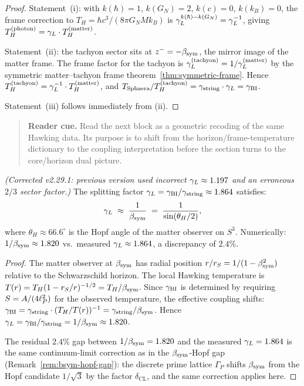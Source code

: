 \begin{proof}
Statement~(i): with $k(\hbar)=1$, $k(G_N)=2$, $k(c)=0$, $k(k_B)=0$,
the frame correction to $T_H = \hbar c^3/(8\pi G_N M k_B)$ is
$\gamma_L^{k(\hbar)-k(G_N)} = \gamma_L^{-1}$, giving
$T_H^{(\mathrm{photon})} = \gamma_L\cdot T_H^{(\mathrm{matter})}$.

Statement~(ii): the tachyon sector sits at $z^- = -\beta_{\mathrm{sym}}$, the mirror
image of the matter frame. The frame factor for the tachyon is
$\gamma_L^{(\mathrm{tachyon})} = 1/\gamma_L^{(\mathrm{matter})}$ by the symmetric
matter--tachyon frame theorem~\ref{thm:symmetric-frame}. Hence
$T_H^{(\mathrm{tachyon})} = \gamma_L^{-1}\cdot T_H^{(\mathrm{matter})}$, and
$T_{\mathrm{Sphaera}}/T_H^{(\mathrm{tachyon})}
= \gamma_{\mathrm{string}}\cdot\gamma_L = \gamma_{\mathrm{BI}}$.

Statement~(iii) follows immediately from (ii).
\end{proof}

\begin{quote}\small
\noindent\textbf{Reader cue.} Read the next block as a geometric recoding of the same Hawking data. Its purpose is to shift from the horizon/frame-temperature dictionary to the coupling interpretation before the section turns to the core/horizon dual picture.
\end{quote}

\begin{theorem}
\label{thm:dual-origin}
\emph{(Corrected v2.29.1: previous version used incorrect $\gamma_L\approx 1.197$
and an erroneous $2/3$ sector factor.)}
The splitting factor $\gamma_L=\gamma_{\mathrm{BI}}/\gamma_{\mathrm{string}}\approx 1.864$ satisfies:
\[
  \gamma_L \;\approx\; \frac{1}{\beta_{\mathrm{sym}}} \;=\; \frac{1}{\sin(\theta_H/2)},
\]
where $\theta_H\approx 66.6^\circ$ is the Hopf angle of the matter observer
on $S^3$. Numerically: $1/\beta_{\mathrm{sym}} \approx 1.820$ vs.\ measured
$\gamma_L\approx 1.864$, a discrepancy of $2.4\%$.
\end{theorem}

\begin{proof}
The matter observer at $\beta_{\mathrm{sym}}$ has radial position $r/r_S=1/(1-\beta_{\mathrm{sym}}^2)$
relative to the Schwarzschild horizon.
The local Hawking temperature is $T(r)=T_H(1-r_S/r)^{-1/2}=T_H/\beta_{\mathrm{sym}}$.
Since $\gamma_{\mathrm{BI}}$ is determined by requiring $S=A/(4\ell_P^2)$ for the observed
temperature, the effective coupling shifts:
$\gamma_{\mathrm{BI}} = \gamma_{\mathrm{string}}\cdot(T_H/T(r))^{-1} = \gamma_{\mathrm{string}}/\beta_{\mathrm{sym}}$.
Hence $\gamma_L = \gamma_{\mathrm{BI}}/\gamma_{\mathrm{string}} = 1/\beta_{\mathrm{sym}} \approx 1.820$.

The residual $2.4\%$ gap between $1/\beta_{\mathrm{sym}}=1.820$ and the measured
$\gamma_L=1.864$ is the same continuum-limit correction as in the $\beta_{\mathrm{sym}}$-Hopf
gap (Remark~\ref{rem:bsym-hopf-gap}): the discrete prime lattice
$\Gamma_P$ shifts $\beta_{\mathrm{sym}}$ from the Hopf candidate $1/\sqrt{3}$ by
the factor $\delta_{\mathrm{CL}}$, and the same correction applies here.
\end{proof}

